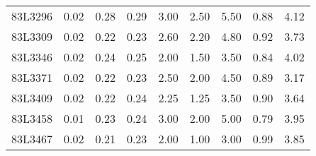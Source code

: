 \begin{center}
\begin{longtable}{|p{0.6in}|p{0.5in}|p{0.5in}|p{0.5in}|p{0.5in}|p{0.5in}|p{0.5in}|p{0.5in}|p{0.5in}|}
 83L3296 & 0.02 & 0.28 & 0.29 & 3.00 & 2.50 & 5.50 & 0.88 & 4.12 \\ 
 83L3309 & 0.02 & 0.22 & 0.23 & 2.60 & 2.20 & 4.80 & 0.92 & 3.73 \\ 
 83L3346 & 0.02 & 0.24 & 0.25 & 2.00 & 1.50 & 3.50 & 0.84 & 4.02 \\ 
 83L3371 & 0.02 & 0.22 & 0.23 & 2.50 & 2.00 & 4.50 & 0.89 & 3.17 \\ 
 83L3409 & 0.02 & 0.22 & 0.24 & 2.25 & 1.25 & 3.50 & 0.90 & 3.64 \\ 
 83L3458 & 0.01 & 0.23 & 0.24 & 3.00 & 2.00 & 5.00 & 0.79 & 3.95 \\ 
 83L3467 & 0.02 & 0.21 & 0.23 & 2.00 & 1.00 & 3.00 & 0.99 & 3.85 \\ 
   \hline
\end{longtable}
\end{center}
%

